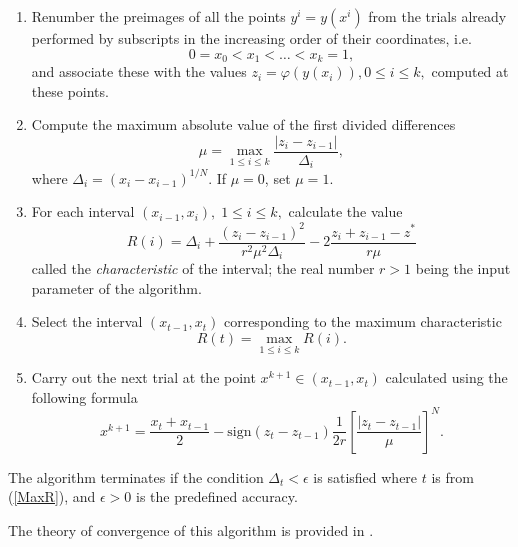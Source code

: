 \documentclass[runningheads]{llncs}
\begin{document}
\begin{enumerate}
	\item 
	Renumber the preimages of all the points $y^i=y(x^i)$
	from the trials already performed  	
by subscripts in the increasing order of their coordinates, i.e.
\begin{equation}\label{x_i}
0=x_0<x_1<\dots <x_k=1,
\end{equation}
and associate these with the values $z_i=\varphi(y(x_i)), 0\leq i \leq k,$ 
computed at these points.
\item
Compute the maximum absolute value of the first divided differences
\begin{equation}\label{mu}
\mu = \max_{1 \leq i \leq k}\frac{\left|z_i-z_{i-1}\right|}{\Delta_i},
\end{equation}
where $\Delta_i=\left(x_i-x_{i-1}\right)^{1/N}$. If $\mu = 0$, set $\mu = 1$.
\item
For each interval $(x_{i-1}, x_i), \; 1\leq i \leq k,$  calculate the value
\begin{equation}\label{R}
R(i)=\Delta_i+\frac{(z_i-z_{i-1})^2}{r^2\mu^2\Delta_i}-2\frac{z_i+z_{i-1}-z^*}{r\mu}
\end{equation}
called the \textit{characteristic} of the interval; the real number $r>1$ being 
the input parameter of the algorithm.
\item 
Select the interval $(x_{t-1},x_t)$ corresponding to the maximum characteristic
\begin{equation}\label{MaxR}
R(t)= \max_{1 \leq i \leq k}R(i).
\end{equation}
\item
Carry out the next trial at the point $x^{k+1}\in(x_{t-1},x_t)$ calculated using
the following formula
\begin{equation}\label{xk1}
x^{k+1} = \frac{x_t+x_{t-1}}{2} - \mathrm{sign}(z_t-z_{t-1})\frac{1}{2r}
\left[\frac{\left|z_t-z_{t-1}\right|}{\mu}\right]^N.
\end{equation}
\end{enumerate}

The algorithm terminates if the condition $\Delta_t < \epsilon$ is satisfied
where $t$ is from (\ref{MaxR}), and $\epsilon>0$ is the predefined accuracy. 

The theory of convergence of this algorithm is provided in \cite{Strongin2000}.
\end{document}
